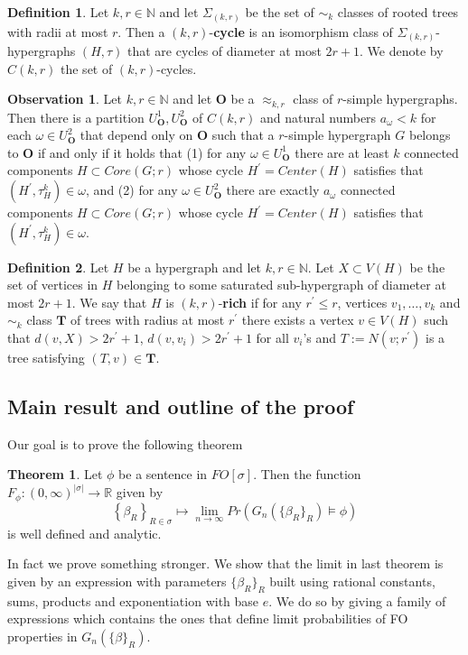\documentclass[12pt,notitlepage,a4paper]{article}
\theoremstyle{definition}
\newtheorem{theorem}{Theorem}[section]
\newtheorem{obs}{Observation}[section]
\newtheorem{definition}{Definition}[section]
\newcommand{\R}{\mathbb{R}}
\newcommand{\N}{\mathbb{N}}
\newcommand{\Ln}{\lim\limits_{n\to \infty}}
\newcommand{\InR}[1]{\left\{ #1_R \right\}_{R\in \sigma}}
\begin{document}
\begin{definition}
	Let $k,r\in\N$ and let $\Sigma_{(k,r)}$ 
	be the set of $\sim_k$ classes
	of rooted trees with radii at most $r$. Then
	a $(k,r)$-\textbf{cycle} is an isomorphism class
	of $\Sigma_{(k,r)}$-hypergraphs 
	$(H,\tau)$ that are cycles of diameter at most $2r+1$.
	We denote by $C(k,r)$ the set of $(k,r)$-cycles.
\end{definition}

\begin{obs}\label{obs:agreeablecores}
	Let $k,r\in\N$ and let $\mathbf{O}$ be a $\approx_{k,r}$ class
	of $r$-simple hypergraphs. 
	Then there is a partition $U^1_\mathbf{O},
	U^2_\mathbf{O}$ of $C(k,r)$ and natural numbers $a_\omega<k$
	for each $\omega\in U^2_\mathbf{O}$ that depend  only on 
	$\mathbf{O}$ such that a $r$-simple hypergraph $G$ belongs to
	$\mathbf{O}$ if and only if it holds that (1) for any $\omega\in U^1_\mathbf{O}$ 
	there are at least $k$ connected components $H \subset Core(G;r)$ whose cycle 		
	$H^\prime=Center(H)$ satisfies that	$(H^{\prime},\tau^k_{H})\in \omega$, and
	(2) for any $\omega\in U^2_\mathbf{O}$ there are exactly $a_\omega$ 
	connected components $H \subset Core(G;r)$ whose cycle 
	$H^\prime=Center(H)$ satisfies that	$(H^{\prime},\tau^k_{H})\in \omega$.	
\end{obs}


\begin{definition} \label{def:rich}
	Let $H$ be a hypergraph and let $k,r\in\N$. Let
	$X\subset V(H)$ be the set of vertices in $H$
	belonging to some saturated sub-hypergraph of diameter
	at most $2r+1$.	We say that $H$ is $(k,r)$-\textbf{rich}
	if for any $r^\prime\leq r$, vertices $v_1,\dots, v_k$ 
	and $\sim_k$ class $\mathbf{T}$ of trees with radius
	at most $r^\prime$ there exists a vertex $v\in V(H)$
	such that $d(v,X)> 2r^\prime+1$, $d(v,v_i)>2r^\prime+1$ for all
	$v_i$'s and $T:=N(v;r^\prime)$ is a tree satisfying
	$(T,v)\in \mathbf{T}$.	
\end{definition}





\subsection{Main result and outline of the proof}
Our goal is to prove the following theorem

\begin{theorem} \label{thm:main}
	Let $\phi$ be a sentence in $FO[\sigma]$. Then
	the function
	$F_\phi: (0,\infty)^{|\sigma|}
	\rightarrow \R$ given by 
	\[
	\InR{\beta} \mapsto \Ln Pr\left( G_n\left(
	\{\beta_R\}_R\right) \models \phi\right)
	\]
	is well defined and analytic. 
\end{theorem}
In fact we prove something stronger. We show that the limit
in last theorem is given by an expression with parameters $\{\beta_R\}_R$
built using rational constants, sums, products and exponentiation with base $e$.
We do so by giving a family of expressions which contains the ones that define 
limit probabilities of FO properties in $G_n(\{\beta\}_R)$.  \par
\end{document}
